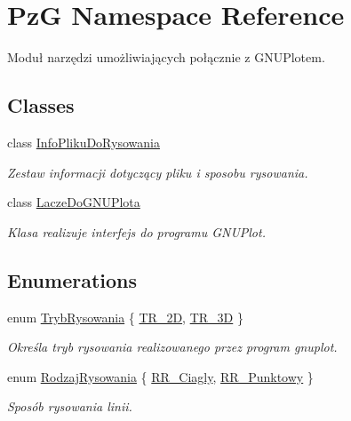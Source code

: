 \hypertarget{namespacePzG}{}\section{PzG Namespace Reference}
\label{namespacePzG}


Moduł narzędzi umożliwiających połącznie z G\+N\+U\+Plotem.  


\subsection*{Classes}
\begin{DoxyCompactItemize}
\item 
class \hyperlink{classPzG_1_1InfoPlikuDoRysowania}{Info\+Pliku\+Do\+Rysowania}
\begin{DoxyCompactList}\small\item\em Zestaw informacji dotyczący pliku i sposobu rysowania. \end{DoxyCompactList}\item 
class \hyperlink{classPzG_1_1LaczeDoGNUPlota}{Lacze\+Do\+G\+N\+U\+Plota}
\begin{DoxyCompactList}\small\item\em Klasa realizuje interfejs do programu G\+N\+U\+Plot. \end{DoxyCompactList}\end{DoxyCompactItemize}
\subsection*{Enumerations}
\begin{DoxyCompactItemize}
\item 
enum \hyperlink{namespacePzG_aeedae1ef10c66d720f9e89de408ca4ca}{Tryb\+Rysowania} \{ \hyperlink{namespacePzG_aeedae1ef10c66d720f9e89de408ca4caa5eb0cf8b3405e136f092efdb489d60c4}{T\+R\+\_\+2D}, 
\hyperlink{namespacePzG_aeedae1ef10c66d720f9e89de408ca4caa856e6b0fa6b8a9dc184c60cf27dcc5d2}{T\+R\+\_\+3D}
 \}\begin{DoxyCompactList}\small\item\em Określa tryb rysowania realizowanego przez program {\ttfamily gnuplot}. \end{DoxyCompactList}
\item 
enum \hyperlink{namespacePzG_a705c92106f39b7d0c34a6739d10ff0b6}{Rodzaj\+Rysowania} \{ \hyperlink{namespacePzG_a705c92106f39b7d0c34a6739d10ff0b6a927eaa159aa4bd3198f0a330b967746d}{R\+R\+\_\+\+Ciagly}, 
\hyperlink{namespacePzG_a705c92106f39b7d0c34a6739d10ff0b6aa01097ee8266d6402b752ef6f9a4690c}{R\+R\+\_\+\+Punktowy}
 \}\begin{DoxyCompactList}\small\item\em Sposób rysowania linii. \end{DoxyCompactList}
\end{DoxyCompactItemize}
